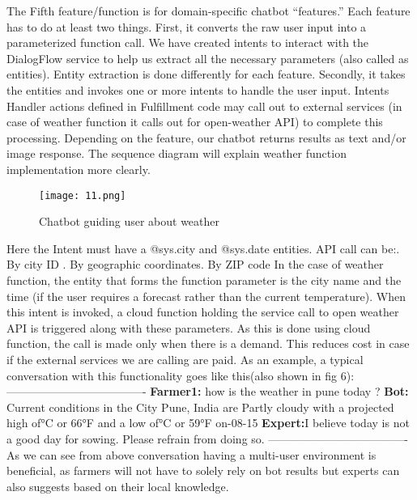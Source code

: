 \documentclass[10pt,conference]{IEEEtran}
\begin{document}
{\raggedright

The Fifth feature/function is for domain-specific chatbot “features.” Each feature has to do at least two things. First, it converts the raw user input into a parameterized function call. We have created intents to interact with the DialogFlow service to help us extract all the necessary parameters (also called as entities). Entity extraction is done differently for each feature. Secondly, it takes the entities and invokes one or more intents to handle the user input. Intents Handler actions defined in Fulfillment code may call out to external services (in case of weather function it calls out for open-weather API) to complete this processing. Depending on the feature, our chatbot returns results as text and/or image response. The sequence diagram \cite{thorat2020review} will explain weather function implementation more clearly.
}
\begin{figure}[h]
 \centering
   \texttt{[image: 11.png]}
  \caption{Chatbot guiding user about weather }
\end{figure}

{\raggedright
Here the Intent must have a @sys.city and @sys.date entities. \newline
API call can be:. By city ID . By geographic coordinates. By ZIP code\newline
In the case of weather function, the entity that forms the function parameter is the city name and the time (if the user requires a forecast rather than the current temperature). When this intent is invoked, a cloud function holding the service call to open weather API is triggered along with these parameters. As this is done using cloud function, the call is made only when there is a demand. This reduces cost in case if the external services we are calling are paid.
As an example, a typical conversation with this functionality goes like this(also shown in fig 6):\newline
-------------------------------------\newline
\textbf{Farmer1:} how is the weather in pune today ?\newline
\textbf{Bot:} Current conditions in the City\newline
       Pune, India are Partly cloudy with a projected high of°C or 66°F and a low of°C or 59°F on-08-15\newline
\textbf{Expert:}I believe today is not a good day for sowing. Please refrain from doing so.\newline
-------------------------------------\newline
As we can see from above conversation having a multi-user environment is beneficial, as farmers will not have to solely rely on bot results but experts can also suggests based on their local knowledge.\newline
}
\end{document}
